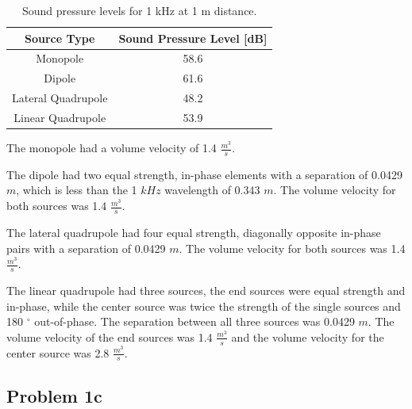 \documentclass[letter, 10pt, margins=0.3in]{texMemo}
\begin{document}
\vspace{0.25cm}
\setlength{\abovecaptionskip}{1.5pt}
\vspace{0.1cm}
{\renewcommand{\arraystretch}{1.5}
\begin{table}[htpb!]
    \footnotesize
    \centering
        \begin{tabular}{ | c | c | }
        \hline
        \textbf{Source Type}  &  \textbf{Sound Pressure Level [dB]}   \\
        \hline
        Monopole  &  58.6   \\
        \hline
        Dipole  &  61.6   \\
        \hline
        Lateral Quadrupole  &  48.2   \\
        \hline
        Linear Quadrupole  &  53.9  \\
        \hline
        \end{tabular}

        \vspace{0.5cm}
        \caption{Sound pressure levels for 1 kHz at 1 m distance.}
        \label{table:1bLevels}

\end{table}


\vspace{0.25cm}
The monopole had a volume velocity of 1.4 $\frac{m^3}{s}$.

\vspace{0.25cm}
The dipole had two equal strength, in-phase elements with a separation of 0.0429 $m$, which is less than the 1 $kHz$ wavelength of 0.343 $m$.  The volume velocity for both sources was 1.4 $\frac{m^3}{s}$.

\vspace{0.25cm}
The lateral quadrupole had four equal strength, diagonally opposite in-phase pairs with a separation of 0.0429 $m$.  The volume velocity for both sources was 1.4 $\frac{m^3}{s}$.

\vspace{0.25cm}
The linear quadrupole had three sources, the end sources were equal strength and in-phase, while the center source was twice the strength of the single sources and 180 $^\circ$ out-of-phase.  The separation between all three sources was 0.0429 $m$.  The volume velocity of the end sources was 1.4 $\frac{m^3}{s}$ and the volume velocity for the center source was 2.8 $\frac{m^3}{s}$.





\newpage
\subsection*{Problem 1c}

}
\end{document}
